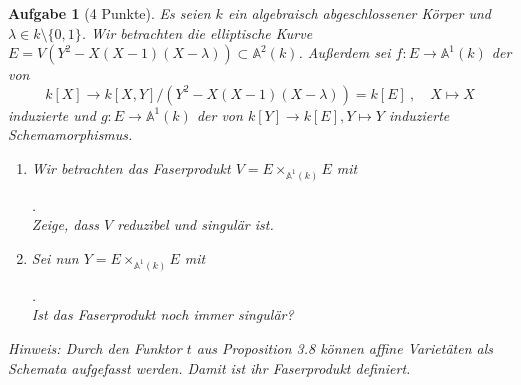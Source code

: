 \documentclass[paper = A4, fontsize=12pt, numbers=noendperiod, chapterprefix=true]{scrbook}
\theoremstyle{break}
\newtheorem{Aufg}{Aufgabe}
\theoremstyle{nonumberbreak}
\theoremstyle{nonumberplain}
\begin{document}
\begin{Aufg}[4 Punkte]
Es seien $k$ ein algebraisch abgeschlossener K\"orper und $\lambda\in k\setminus\{0,1\}$. Wir betrachten die elliptische Kurve $E = V(Y^2 - X(X-1)(X-\lambda)) \subset \mathbb{A}^2(k)$. Au\ss erdem sei $f\colon E \to \mathbb{A}^1(k)$ der von 
\[k[X] \to k[X,Y]/(Y^2 - X(X-1)(X-\lambda)) = k[E]\ , \quad X\mapsto X\]
induzierte und $g\colon E \to \mathbb{A}^1(k)$ der von 
$k[Y] \to k[E], Y\mapsto Y$
induzierte Schemamorphismus.
\begin{enumerate}%
 \item Wir betrachten das Faserprodukt $V = E \times_{\mathbb{A}^1(k)} E$ mit
\begin{minipage}{3cm}
\end{minipage}
. \\
Zeige, dass $V$ reduzibel und singul\"ar ist.
\item Sei nun $Y = E \times_{\mathbb{A}^1(k)} E$ mit
\begin{minipage}{3cm}
\end{minipage}
.\\ Ist das Faserprodukt noch immer singul\"ar?
\end{enumerate}
\textit{Hinweis: Durch den Funktor $t$ aus Proposition 3.8 k\"onnen affine Variet\"aten als Schemata aufgefasst werden. Damit ist ihr Faserprodukt definiert.}
\end{Aufg}
\end{document}
